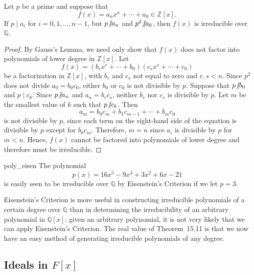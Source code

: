 \begin{theorem}
Let $p$ be a prime and suppose that
\[
f(x) = a_n x^n + \cdots + a_0 \in {\mathbb Z}[x].
\]
If $p \mid a_i$ for $i = 0, 1, \ldots, n-1$, but $p {\not{\mid}} a_n$
and $p^2 {\not{\mid}} a_0$, then $f(x)$ is irreducible over ${\mathbb Q}$. 
\end{theorem}
 
 
\begin{proof}
By Gauss's Lemma, we need only show that $f(x)$ does not factor into
polynomials of lower degree in ${\mathbb Z}[x]$. Let  
\[
f(x) = (b_rx^r + \cdots + b_0)(c_s x^s + \cdots + c_0 )
\]
be a factorization in ${\mathbb Z}[x]$, with $b_r$ and $c_s$ not equal to
zero and $r, s < n$. Since $p^2$ does not divide $a_0 = b_0 c_0$,
either $b_0$ or $c_0$ is not divisible by $p$. Suppose that $p {\not{\mid}}
b_0$ and $p \mid c_0$. Since $p {\not{\mid}} a_n$ and $a_n = b_r c_s$,
neither $b_r$ nor $c_s$ is divisible by $p$. Let $m$ be the smallest
value of $k$ such that $p {\not{\mid}} c_k$. Then  
\[
a_m = b_0 c_m + b_1 c_{m-1} + \cdots + b_m c_0
\]
is not divisible by $p$, since each term on the right-hand side of the
equation is divisible by $p$ except for $b_0 c_m$.  Therefore, $m =n$
since $a_i$ is divisible by $p$ for $m < n$.  Hence, $f(x)$ cannot be
factored into polynomials of lower degree and therefore must be
irreducible. 
\end{proof}
 
 
\begin{example}{poly_eisen}
The polynomial
\[
p(x) = 16 x^5  -9 x^4 + 3x^2 + 6 x - 21
\]
is easily seen to be irreducible over ${\mathbb Q}$ by Eisenstein's
Criterion if we let $p = 3$.
\end{example}
 
 
\medskip
 
 
Eisenstein's Criterion is more useful in constructing irreducible
polynomials of a certain degree over ${\mathbb Q}$ than in determining the
irreducibility of an arbitrary polynomial in ${\mathbb Q}[x]$: given an
arbitrary polynomial, it is not very likely that we can apply
Eisenstein's Criterion.  The real value of Theorem~15.11 is that we now
have an easy method of generating irreducible polynomials of any
degree. 
 
 
 
\subsection*{Ideals in $F[x]$}
 
